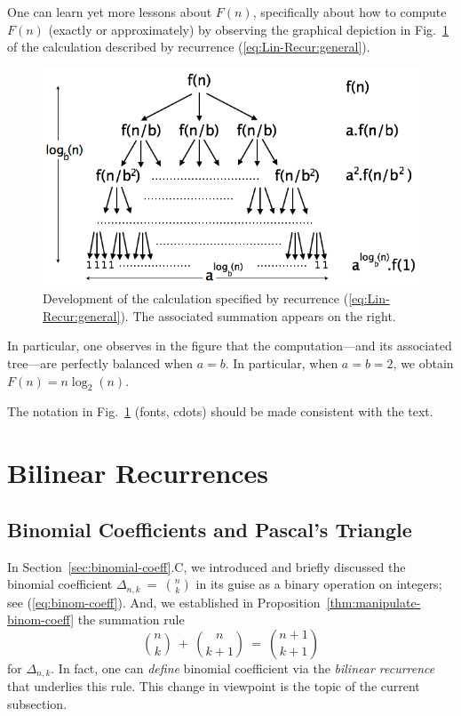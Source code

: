 One can learn yet more lessons about $F(n)$, specifically about how to
compute $F(n)$ (exactly or approximately) by observing the graphical
depiction in Fig.~\ref{fig:masterTheorem} of the calculation described
by recurrence (\ref{eq:Lin-Recur:general}).
\begin{figure}[htb]
\begin{center}
       \includegraphics[scale=0.4]{FiguresMaths/MasterTheoremgeneral}
\caption{Development of the calculation specified by recurrence
  (\ref{eq:Lin-Recur:general}).  The associated summation appears on
  the right.
\label{fig:masterTheorem}}
\end{center}
\end{figure}
In particular, one observes in the figure that the computation---and
its associated tree---are perfectly balanced when $a=b$.  In
particular, when $a=b=2$, we obtain $F(n) = n \log_2(n)$.

{\Arny The notation in Fig.~\ref{fig:masterTheorem} (fonts, cdots)
  should be made consistent with the text.}


\section{Bilinear Recurrences}
\label{sec:bilinear-recurrences}

\subsection{Binomial Coefficients and Pascal's Triangle}
\label{sec:binomial-coeff+Pascal}

In Section~\ref{sec:binomial-coeff}.C, we introduced and briefly
discussed the binomial coefficient 
$\displaystyle \Delta_{n,k} \ = \ {n \choose k}$ in its guise as a
binary operation on integers; see (\ref{eq:binom-coeff}).  And, we
established in Proposition~\ref{thm:manipulate-binom-coeff} the
summation rule
\[ {n \choose k} \ + \ {n \choose {k+1}} \ = \ {{n+1} \choose {k+1}} \]
for $\Delta_{n,k}$.  In fact, one can {\em define} binomial
coefficient via the {\em bilinear recurrence} that underlies this
rule.  This change in viewpoint is the topic of the current
subsection.

